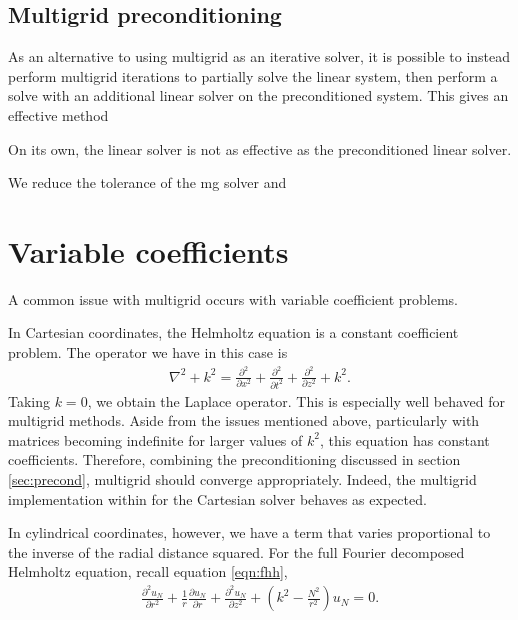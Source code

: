 

\subsection{Multigrid preconditioning}

As an alternative to using multigrid as an iterative solver, it is possible to instead perform multigrid iterations to partially solve the linear system, then perform a solve with an additional linear solver on the preconditioned system.
This gives an effective method  

On its own, the linear solver is not as effective as the preconditioned linear solver.



We reduce the tolerance of the mg solver and 





\section{Variable coefficients}

A common issue with multigrid occurs with variable coefficient problems.
\cite{briggs}

In Cartesian coordinates, the Helmholtz equation is a constant coefficient problem.
The operator we have in this case is
\begin{align}
	\nabla^2 + k^2 = \frac{\partial^2}{\partial x^2} + \frac{\partial^2}{\partial t^2} + \frac{\partial^2}{\partial z^2} + k^2.
\end{align}
Taking $k=0$, we obtain the Laplace operator.
This is especially well behaved for multigrid methods.
Aside from the issues mentioned above, particularly with matrices becoming indefinite for larger values of $k^2$, this equation has constant coefficients.
Therefore, combining the preconditioning discussed in section \ref{sec:precond}, multigrid should converge appropriately.
Indeed, the multigrid implementation within \oomph for the Cartesian solver behaves as expected.

In cylindrical coordinates, however, we have a term that varies proportional to the inverse of the radial distance squared.
For the full Fourier decomposed Helmholtz equation, recall equation \eqref{eqn:fhh},
\begin{align}
	\frac{\partial^2 u_N}{\partial r^2}
			 + \frac{1}{r} \frac{\partial u_N}{\partial r}
			 + \frac{\partial^2 u_N}{\partial z^2}
			 + (k^2 - \frac{N^2}{r^2})u_N = 0. \label{eqn:full_fhh}
\end{align}


